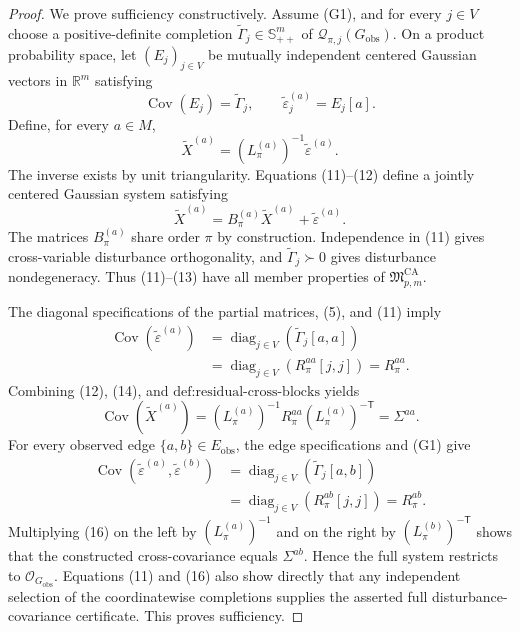 \documentclass{article}
\begin{document}
\begin{proof}
We prove sufficiency constructively.  Assume (G1), and for every \(j\in V\) choose a positive-definite completion \(\widetilde\Gamma_j\in\mathbb S_{++}^m\) of \(\mathcal Q_{\pi,j}(G_{\mathrm{obs}})\).  On a product probability space, let \((E_j)_{j\in V}\) be mutually independent centered Gaussian vectors in \(\mathbb R^m\) satisfying
\[
\operatorname{Cov}(E_j)=\widetilde\Gamma_j,
\qquad
\widetilde\varepsilon_j^{(a)}=E_j[a].
\tag{11}
\]
Define, for every \(a\in M\),
\[
\widetilde X^{(a)}
=(L_\pi^{(a)})^{-1}\widetilde\varepsilon^{(a)}.
\tag{12}
\]
The inverse exists by unit triangularity.  Equations (11)--(12) define a jointly centered Gaussian system satisfying
\[
\widetilde X^{(a)}
=B_\pi^{(a)}\widetilde X^{(a)}+\widetilde\varepsilon^{(a)}.
\tag{13}
\]
The matrices \(B_\pi^{(a)}\) share order \(\pi\) by construction.  Independence in (11) gives cross-variable disturbance orthogonality, and \(\widetilde\Gamma_j\succ0\) gives disturbance nondegeneracy.  Thus (11)--(13) have all member properties of \(\mathfrak M_{p,m}^{\mathrm{CA}}\).

The diagonal specifications of the partial matrices, (5), and (11) imply
\[
\begin{aligned}
\operatorname{Cov}(\widetilde\varepsilon^{(a)})
&=\operatorname{diag}_{j\in V}(\widetilde\Gamma_j[a,a])\\
&=\operatorname{diag}_{j\in V}(R_\pi^{aa}[j,j])
=R_\pi^{aa}.
\end{aligned}
\tag{14}
\]
Combining (12), (14), and \(\text{def:residual-cross-blocks}\) yields
\[
\operatorname{Cov}(\widetilde X^{(a)})
=(L_\pi^{(a)})^{-1}R_\pi^{aa}(L_\pi^{(a)})^{-\mathsf T}
=\Sigma^{aa}.
\tag{15}
\]
For every observed edge \(\{a,b\}\in E_{\mathrm{obs}}\), the edge specifications and (G1) give
\[
\begin{aligned}
\operatorname{Cov}(\widetilde\varepsilon^{(a)},\widetilde\varepsilon^{(b)})
&=\operatorname{diag}_{j\in V}(\widetilde\Gamma_j[a,b])\\
&=\operatorname{diag}_{j\in V}(R_\pi^{ab}[j,j])
=R_\pi^{ab}.
\end{aligned}
\tag{16}
\]
Multiplying (16) on the left by \((L_\pi^{(a)})^{-1}\) and on the right by \((L_\pi^{(b)})^{-\mathsf T}\) shows that the constructed cross-covariance equals \(\Sigma^{ab}\).  Hence the full system restricts to \(\mathcal O_{G_{\mathrm{obs}}}\).  Equations (11) and (16) also show directly that any independent selection of the coordinatewise completions supplies the asserted full disturbance-covariance certificate.  This proves sufficiency.


\end{proof}
\end{document}
